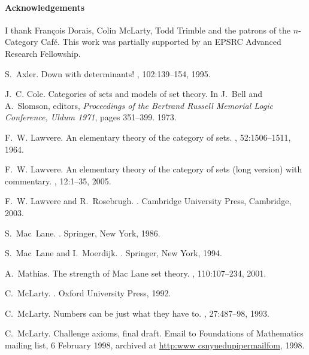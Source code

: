 \documentclass[12pt]{article}
\begin{document}
\paragraph*{Acknowledgements}
I thank Fran\c{c}ois Dorais, Colin McLarty, Todd Trimble and the patrons of
the $n$-Category Caf\'e.  This work was partially supported by an EPSRC
Advanced Research Fellowship.


\begin{thebibliography}{10}

S.~Axler.
\newblock Down with determinants!
, 102:139--154, 1995.

J.~C. Cole.
\newblock Categories of sets and models of set theory.
\newblock In J.~Bell and A.~Slomson, editors, {\em Proceedings of the Bertrand
  Russell Memorial Logic Conference, Uldum 1971}, pages 351--399. 1973.

F.~W. Lawvere.
\newblock An elementary theory of the category of sets.
,
  52:1506--1511, 1964.

F.~W. Lawvere.
\newblock An elementary theory of the category of sets (long version) with
  commentary.
, 12:1--35,
  2005.

F.~W. Lawvere and R.~Rosebrugh.
.
\newblock Cambridge University Press, Cambridge, 2003.

S.~Mac~Lane.
.
\newblock Springer, New York, 1986.

S.~Mac~Lane and I.~Moerdijk.
.
\newblock Springer, New York, 1994.

A.~Mathias.
\newblock The strength of {M}ac {L}ane set theory.
, 110:107--234, 2001.

C.~Mc{L}arty.
.
\newblock Oxford University Press, 1992.

C.~Mc{L}arty.
\newblock Numbers can be just what they have to.
, 27:487--98, 1993.

C.~Mc{L}arty.
\newblock Challenge axioms, final draft.
\newblock Email to Foundations of Mathematics mailing list, 6 February 1998,
  archived at \href{http://www.cs.nyu.edu/pipermail/fom}{http:\dblslsh www\dt
  cs\dt nyu\dt edu\slsh pipermail\slsh fom}, 1998.


\end{thebibliography}
\end{document}
